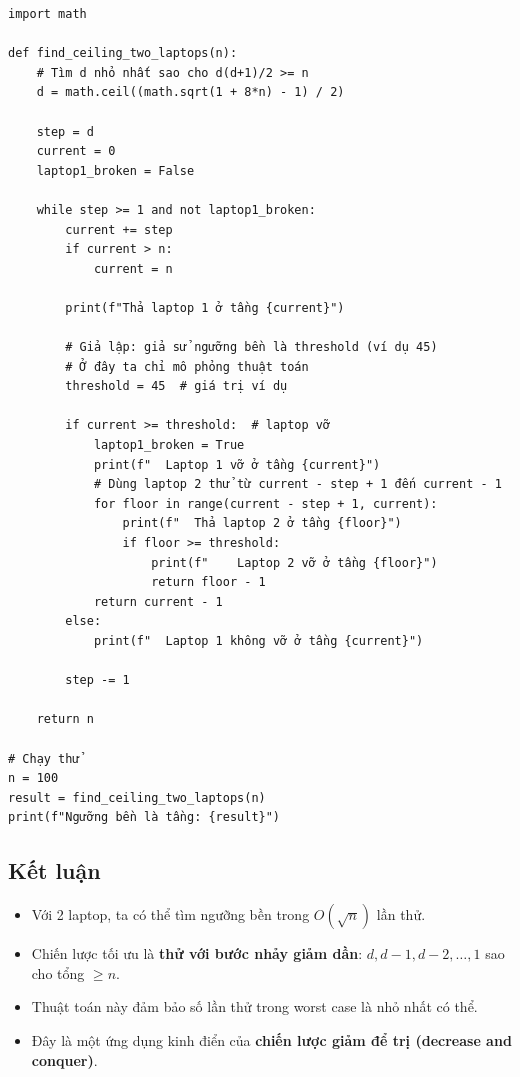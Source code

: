 \documentclass{article}
\begin{document}
\begin{verbatim}
import math

def find_ceiling_two_laptops(n):
    # Tìm d nhỏ nhất sao cho d(d+1)/2 >= n
    d = math.ceil((math.sqrt(1 + 8*n) - 1) / 2)
    
    step = d
    current = 0
    laptop1_broken = False
    
    while step >= 1 and not laptop1_broken:
        current += step
        if current > n:
            current = n
        
        print(f"Thả laptop 1 ở tầng {current}")
        
        # Giả lập: giả sử ngưỡng bền là threshold (ví dụ 45)
        # Ở đây ta chỉ mô phỏng thuật toán
        threshold = 45  # giá trị ví dụ
        
        if current >= threshold:  # laptop vỡ
            laptop1_broken = True
            print(f"  Laptop 1 vỡ ở tầng {current}")
            # Dùng laptop 2 thử từ current - step + 1 đến current - 1
            for floor in range(current - step + 1, current):
                print(f"  Thả laptop 2 ở tầng {floor}")
                if floor >= threshold:
                    print(f"    Laptop 2 vỡ ở tầng {floor}")
                    return floor - 1
            return current - 1
        else:
            print(f"  Laptop 1 không vỡ ở tầng {current}")
        
        step -= 1
    
    return n

# Chạy thử
n = 100
result = find_ceiling_two_laptops(n)
print(f"Ngưỡng bền là tầng: {result}")
\end{verbatim}

\subsection{Kết luận}

\begin{itemize}
    \item Với 2 laptop, ta có thể tìm ngưỡng bền trong \(O(\sqrt{n})\) lần thử.
    \item Chiến lược tối ưu là \textbf{thử với bước nhảy giảm dần}: \(d, d-1, d-2, \dots, 1\) sao cho tổng \(\ge n\).
    \item Thuật toán này đảm bảo số lần thử trong worst case là nhỏ nhất có thể.
    \item Đây là một ứng dụng kinh điển của \textbf{chiến lược giảm để trị (decrease and conquer)}.
\end{itemize}
\end{document}
